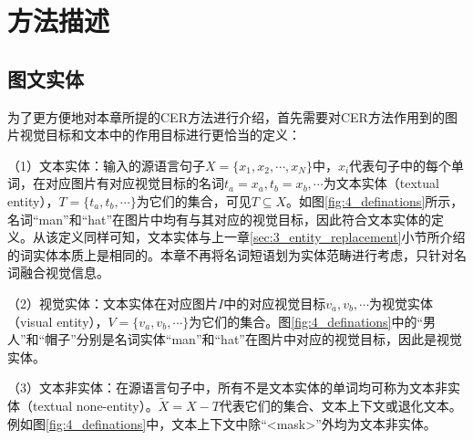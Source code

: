 \section{方法描述}

\subsection{图文实体}
\label{sec:4_entities}

为了更方便地对本章所提的CER方法进行介绍，首先需要对CER方法作用到的图片视觉目标和文本中的作用目标进行更恰当的定义：

（1）{\sffamily 文本实体：}输入的源语言句子$X=\{x_1,x_2,\cdots,x_N\}$中，$x_i$代表句子中的每个单词，在对应图片有对应视觉目标的名词$t_a=x_a,t_b=x_b,\cdots$为文本实体（textual entity），$T=\{t_a,t_b,\cdots\}$为它们的集合，可见$T \subseteq X$。如图\ref{fig:4_definations}所示，名词“man”和“hat”在图片中均有与其对应的视觉目标，因此符合文本实体的定义。从该定义同样可知，文本实体与上一章\ref{sec:3_entity_replacement}小节所介绍的词实体本质上是相同的。本章不再将名词短语划为实体范畴进行考虑，只针对名词融合视觉信息。

（2）{\sffamily 视觉实体：}文本实体在对应图片$I$中的对应视觉目标$v_a,v_b,\cdots$为视觉实体（visual entity），$V=\{v_a,v_b,\cdots\}$为它们的集合。图\ref{fig:4_definations}中的“男人”和“帽子”分别是名词实体“man”和“hat”在图片中对应的视觉目标，因此是视觉实体。

（3）{\sffamily 文本非实体：}在源语言句子中，所有不是文本实体的单词均可称为文本非实体（textual none-entity）。$\tilde{X}=X-T$代表它们的集合、文本上下文或退化文本。例如图\ref{fig:4_definations}中，文本上下文中除“<mask>”外均为文本非实体。

%

%

